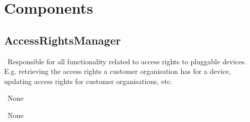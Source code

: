 \section{Components}\label{sec:components}
\subsection{AccessRightsManager}\label{comp:OnlineServiceOnlineServiceAccessRightsManager}
	\begin{description}
		\item[Responsibility:]~Responsible for all functionality related to access rights to pluggable devices.
E.g. retrieving the access rights a customer organisation has for a device,
updating access rights for customer organisations, etc.
		\item[Super-components:]~None
		\item[Sub-components:]~None
		\item[Provided interfaces:]~\iconprovided{}~
		\item[Required interfaces:]~\iconrequired{}~		
	\end{description}
